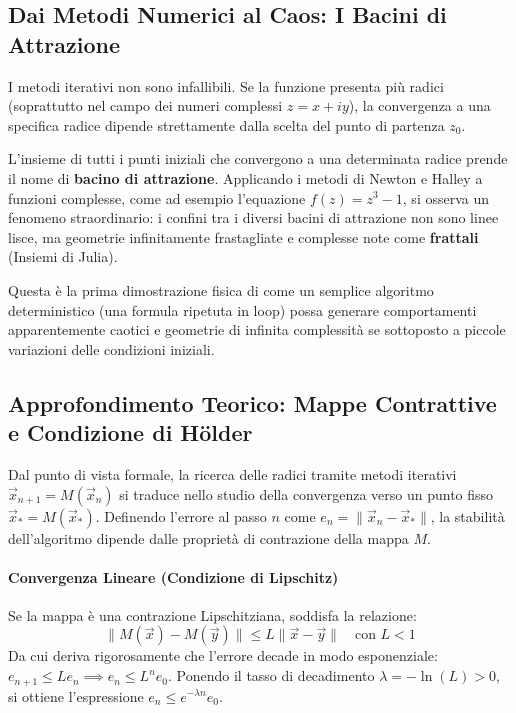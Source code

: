 \documentclass[12pt,a4paper]{article}
\begin{document}
\subsection{Dai Metodi Numerici al Caos: I Bacini di Attrazione}
I metodi iterativi non sono infallibili. Se la funzione presenta più radici (soprattutto nel campo dei numeri complessi $z = x + iy$), la convergenza a una specifica radice dipende strettamente dalla scelta del punto di partenza $z_0$. 

L'insieme di tutti i punti iniziali che convergono a una determinata radice prende il nome di \textbf{bacino di attrazione}. Applicando i metodi di Newton e Halley a funzioni complesse, come ad esempio l'equazione $f(z) = z^3 - 1$, si osserva un fenomeno straordinario: i confini tra i diversi bacini di attrazione non sono linee lisce, ma geometrie infinitamente frastagliate e complesse note come \textbf{frattali} (Insiemi di Julia). 

Questa è la prima dimostrazione fisica di come un semplice algoritmo deterministico (una formula ripetuta in loop) possa generare comportamenti apparentemente caotici e geometrie di infinita complessità se sottoposto a piccole variazioni delle condizioni iniziali.

\subsection*{Approfondimento Teorico: Mappe Contrattive e Condizione di Hölder}

Dal punto di vista formale, la ricerca delle radici tramite metodi iterativi $\vec{x}_{n+1} = M(\vec{x}_n)$ si traduce nello studio della convergenza verso un punto fisso $\vec{x}_* = M(\vec{x}_*)$. Definendo l'errore al passo $n$ come $e_n = \|\vec{x}_n - \vec{x}_*\|$, la stabilità dell'algoritmo dipende dalle proprietà di contrazione della mappa $M$.

\paragraph{Convergenza Lineare (Condizione di Lipschitz)}
Se la mappa è una contrazione Lipschitziana, soddisfa la relazione:
\begin{equation}
\|M(\vec{x}) - M(\vec{y})\| \le L \|\vec{x} - \vec{y}\| \quad \text{con } L < 1
\end{equation}
Da cui deriva rigorosamente che l'errore decade in modo esponenziale: $e_{n+1} \le L e_n \implies e_n \le L^n e_0$.
Ponendo il tasso di decadimento $\lambda = -\ln(L) > 0$, si ottiene l'espressione $e_n \le e^{-\lambda n} e_0$.
\end{document}
